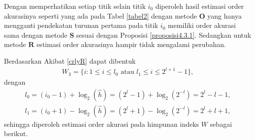\begin{table}[htp]
        \centering
        \caption{Tabel estimasi order akurasi eksperimen pertama dengan interval sama besar $h=2^{-l}$, $5 \leq l \leq 8$, $W = \{ i : 0 \leq i \leq 2^{l+1} \} \backslash \{i_0\}$}
        \label{tabel2}
    \end{table}

Dengan memperhatikan setiap titik selain titik $i_0$ diperoleh hasil estimasi order akurasinya seperti yang ada pada Tabel \ref{tabel2} dengan metode $\textbf{O}$ yang hanya mengganti pendekatan turunan pertama pada titik $i_0$ memiliki order akurasi sama dengan metode $\textbf{S}$ sesuai dengan Proposisi \ref{proposisi4.3.1}. Sedangkan untuk metode $\textbf{R}$ estimasi order akurasinya hampir tidak mengalami perubahan.

Berdasarkan Akibat \ref{crlyR} dapat dibentuk 
\begin{align*}
    W_3=\{ i : 1\leq i \leq l_0 \text{ atau } l_1 \leq i \leq 2^{l+1} - 1\},
\end{align*} 
dengan
\begin{align*}
    l_0 = (i_0 - 1) + \log_2(\hat{h}) = (2^l - 1) + \log_2(2^{-l}) = 2^l - l - 1,\\
    l_1 = (i_0 + 1) - \log_2(\hat{h}) = (2^l + 1) - \log_2(2^{-l}) = 2^l + l + 1,
\end{align*}
sehingga diperoleh estimasi order akurasi pada himpunan indeks $W$ sebagai berikut.

